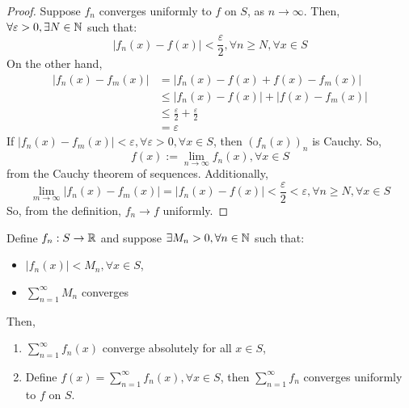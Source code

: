 \begin{proof}
    Suppose $f_n$ converges uniformly to $f$ on $S$, as $n \to \infty$. Then, $\forall \varepsilon > 0, \exists N \in \mathbb{N}$ such that:
    \begin{equation*}
        |f_n(x) - f(x)| < \frac{\varepsilon}{2}, \forall n \geq N, \forall x \in S
    \end{equation*}
    On the other hand,
    \begin{align*}
        |f_n(x) - f_m(x)| &= |f_n(x) - f(x) + f(x) - f_m(x)| \\
        &\leq |f_n(x) - f(x)| + |f(x) - f_m(x)| \\
        &\leq \frac{\varepsilon}{2} + \frac{\varepsilon}{2} \\
        &= \varepsilon
    \end{align*}
    If $|f_n(x) - f_m(x)| < \varepsilon, \forall \varepsilon > 0, \forall x \in S$, then $(f_n(x))_n$ is Cauchy. So,
    \begin{equation*}
        f(x) := \lim \limits_{n \to \infty} f_n(x), \forall x \in S
    \end{equation*}
    from the Cauchy theorem of sequences. Additionally,
    \begin{equation*}
        \lim \limits_{m \to \infty} |f_n(x) - f_m(x)| = |f_n(x) - f(x)| < \frac{\varepsilon}{2} < \varepsilon, \forall n \geq N, \forall x \in S
    \end{equation*}
    So, from the definition, $f_n \to f$ uniformly.
\end{proof}

\begin{theorem}
    Define $f_n: S \to \mathbb{R}$ and suppose $\exists M_n > 0, \forall n \in \mathbb{N}$ such that:
    \begin{itemize}
        \item $|f_n(x)| < M_n, \forall x \in S$,
        \item $\sum_{n=1}^\infty M_n$ converges
    \end{itemize}
    Then,
    \begin{enumerate}
        \item $\sum_{n=1}^\infty f_n(x)$ converge absolutely for all $x \in S$,
        \item Define $f(x) = \sum_{n = 1}^\infty f_n(x), \forall x \in S$, then $\sum_{n=1}^\infty f_n$ converges uniformly to $f$ on $S$.
    \end{enumerate}
\end{theorem}

